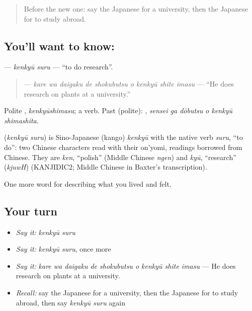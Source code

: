 \begin{quote}
Before the new one: say the Japanese for a university, then the Japanese for to study abroad.
\end{quote}

\subsection*{You'll want to know: }
\textbf{} — \emph{kenkyū suru} — \textquotedblleft{}to do research\textquotedblright{}.

\begin{quote}
\textbf{   } — \emph{kare wa daigaku de shokubutsu o kenkyū shite imasu} — \textquotedblleft{}He does research on plants at a university.\textquotedblright{}
\end{quote}

Polite \textbf{}, \emph{kenkyūshimasu}; a  verb. Past (polite): \textbf{  }, \emph{sensei ga dōbutsu o kenkyū shimashita}.

\begin{cousinweb}
\textbf{} (\emph{kenkyū suru}) is Sino-Japanese (kango) \emph{kenkyū} with the native verb \emph{suru}, \textquotedblleft{}to do\textquotedblright{}: two Chinese characters read with their on'yomi, readings borrowed from Chinese. They are \emph{ken}, \textquotedblleft{}polish\textquotedblright{} (Middle Chinese \emph{ngen}) and \emph{kyū}, \textquotedblleft{}research\textquotedblright{} (\emph{kjuwH}) (KANJIDIC2; Middle Chinese in Baxter's transcription).
\end{cousinweb}

\begin{grammarlens}[title={What you've built}]
One more word for describing what you lived and felt.
\end{grammarlens}

\subsection*{Your turn}
\begin{itemize}
\raggedright
  \item \emph{Say it:} \emph{kenkyū suru}
  \item \emph{Say it:} \emph{kenkyū suru}, once more
  \item \emph{Say it:} \emph{kare wa daigaku de shokubutsu o kenkyū shite imasu} — He does research on plants at a university.
  \item \emph{Recall:} say the Japanese for a university, then the Japanese for to study abroad, then say \emph{kenkyū suru} again
\end{itemize}

